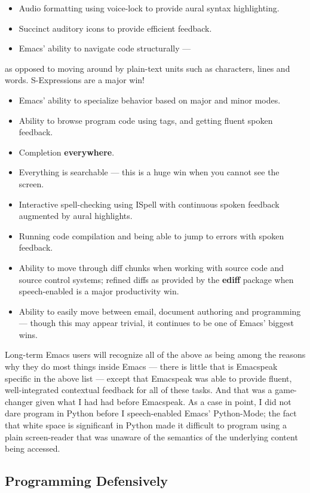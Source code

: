 \documentclass[11pt]{article}
\begin{document}
\begin{itemize}
\item Audio formatting using voice-lock to provide aural syntax
highlighting.
\item Succinct auditory icons to provide efficient feedback.
\item Emacs' ability to navigate code structurally   —
\end{itemize}
as opposed to moving around by plain-text units such as
  characters, lines and words. S-Expressions are a major win!
\begin{itemize}
\item Emacs' ability to specialize behavior based on major and
minor modes.
\item Ability to browse program code using  tags, and getting
fluent spoken feedback.
\item Completion \textbf{everywhere}.
\item Everything is searchable   —   this is a huge win when you
cannot see the screen.
\item Interactive spell-checking using ISpell with continuous
spoken feedback augmented by aural highlights.
\item Running code compilation  and being able to jump to errors
with spoken feedback.
\item Ability to move through diff chunks when working with source
code and source control systems; refined diffs as provided by
the \textbf{ediff} package when speech-enabled is a major
productivity win.
\item Ability to easily move between email, document authoring and
programming — though this may appear trivial, it continues to
be one of Emacs' biggest wins.
\end{itemize}


Long-term Emacs users will recognize all of the above as being
among the reasons why they do most things inside Emacs — there is
little that is Emacspeak specific in the above list — except that
Emacspeak was able to provide fluent, well-integrated contextual
feedback for all of these tasks. And that was a game-changer
given what I had had before Emacspeak. As a case in point, I did
not dare program in Python before I speech-enabled Emacs'
Python-Mode; the fact that white space is significan\'t in Python
made it difficult to program using a plain screen-reader that was
unaware of the semantics of the underlying content being
accessed.
\subsection{Programming Defensively}
\label{sec-5-1}
\end{document}
